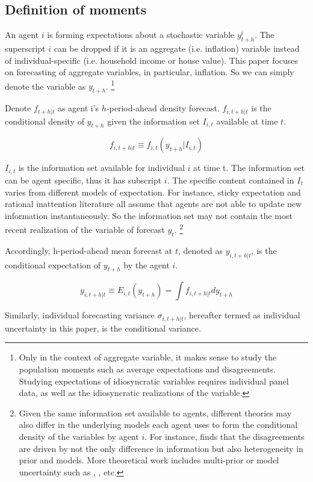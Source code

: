 \documentclass[12pt]{article}
\begin{document}
	\subsection{Definition of moments}
	
	An agent $i$ is forming expectations about a stochastic variable $y^i_{t+h}$. The superscript $i$ can be dropped if it is an aggregate (i.e. inflation) variable instead of individual-specific  (i.e. household income or house value). This paper focuses on forecasting of aggregate variables, in particular, inflation. So we can simply denote the variable as $y_{t+h}$.  \footnote{Only in the context of aggregate variable, it makes sense to study the population moments such as average expectations and disagreements. Studying expectations of idiosyncratic variables requires individual panel data, as well as the idiosyncratic realizations of the variable. }
	
	Denote $ f_{t+h|t}$ as agent i's $h$-period-ahead density forecast. $ f_{i,t+h|t}$ is the conditional density of $y_{t+h}$ given the information set $I_{i,t}$ available at time $t$. 
	
	$$f_{i,t+h|t} \equiv f_{i,t}(y_{t+h}|I_{i,t})$$
	
	
	$I_{i,t}$ is the information set available for individual $i$ at time t. The information set can be agent specific, thus it has subscript $i$.  The specific content contained in $I_t$ varies from different models of expectation. For instance, sticky expectation and rational inattention literature all assume that agents are not able to update new information instantaneously. So the information set may not contain the most recent realization of the variable of forecast $y_t$. \footnote{Given the same information set available to agents, different theories may also differ in the underlying models each agent uses to form the conditional density of the variables by agent $i$. For instance, \citet{patton2010forecasters} finds that the disagreements are driven by not the only difference in information but also heterogeneity in prior and models. More theoretical work includes multi-prior or model uncertainty such as \citet{hansen2001robust}, \citet{hansen2008robustness}, etc.}
	
	Accordingly, h-period-ahead mean forecast at $t$, denoted as $ y_{i,t+h|t}$, is the conditional expectation of $y_{t+h}$ by the agent $i$. 
	
	$$y_{i,t+h|t} \equiv E_{i,t}(y_{t+h}) =\int f_{i, t+h|t} d y_{t+h}$$
	
	Similarly, individual forecasting variance $\sigma_{i,t+h|t}$, hereafter termed as individual uncertainty in this paper, is the conditional variance.
	
\end{document}
